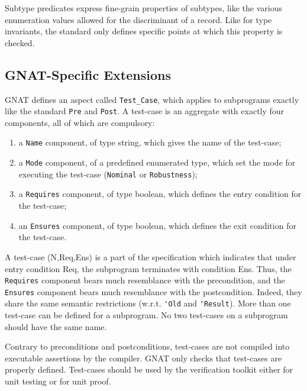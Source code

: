 \documentclass{article}
\begin{document}
Subtype predicates express fine-grain properties of subtypes, like the various
enumeration values allowed for the discriminant of a record. Like for type
invariants, the standard only defines specific points at which this property is
checked.

\subsection{GNAT-Specific Extensions}
\label{sub:formal-containers}

GNAT defines an aspect called \verb|Test_Case|, which applies to subprograms
exactly like the standard \verb|Pre| and \verb|Post|. A test-case is an
aggregate with exactly four components, all of which are compulsory:
\begin{enumerate}
\item a \verb|Name| component, of type string, which gives the name of the
  test-case;
\item a \verb|Mode| component, of a predefined enumerated type, which set the
  mode for executing the test-case (\verb|Nominal| or \verb|Robustness|);
\item a \verb|Requires| component, of type boolean, which defines the entry
  condition for the test-case;
\item an \verb|Ensures| component, of type boolean, which defines the exit
  condition for the test-case.
\end{enumerate}

A test-case (N,Req,Ens) is a part of the specification which indicates that
under entry condition Req, the subprogram terminates with condition Ens. Thus,
the \verb|Requires| component bears much resemblance with the precondition, and
the \verb|Ensures| component bears much resemblance with the
postcondition. Indeed, they share the same semantic restrictions
(w.r.t. \verb|'Old| and \verb|'Result|).  More than one test-case can be
defined for a subprogram. No two test-cases on a subprogram should have the
same name.

Contrary to preconditions and postconditions, test-cases are not compiled into
executable assertions by the compiler. GNAT only checks that test-cases are
properly defined. Test-cases should be used by the verification toolkit either
for unit testing or for unit proof.
\end{document}
